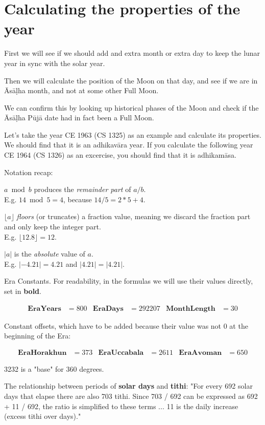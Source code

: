\documentclass[11pt,oneside]{memoir-article}
\begin{document}
\section{Calculating the properties of the year}
\label{sec-5-2}

First we will see if we should add and extra month or extra day to keep the
lunar year in sync with the solar year.

Then we will calculate the position of the Moon on that day, and see if we are
in Āsāḷha month, and not at some other Full Moon.

We can confirm this by looking up historical phases of the Moon and check if the
Āsāḷha Pūjā date had in fact been a Full Moon.

Let's take the year CE 1963 (CS 1325) as an example and calculate its
properties. We should find that it is an adhikavāra year. If you calculate the
following year CE 1964 (CS 1326) as an excercise, you should find that it is
adhikamāsa.

Notation recap:

$a \bmod b$ produces the \emph{remainder part} of $a/b$.\\
E.g. $14 \bmod 5 = 4$, because $14/5 = 2*5 + 4$.

$\lfloor a \rfloor$ \emph{floors} (or truncates) a fraction value, meaning we discard
the fraction part and only keep the integer part.\\
E.g. $\lfloor 12.8 \rfloor = 12$.

$|a|$ is the \emph{absolute} value of $a$.\\
E.g. $|-4.21| = 4.21$ and $|4.21| = |4.21|$.


Era Constants. For readability, in the formulas we will use their values directly, set in \textbf{bold}.

\begin{align*}
  \mathbf{EraYears} & = 800 & \mathbf{EraDays} & = 292207 & \mathbf{MonthLength} & = 30
\end{align*}

Constant offsets, which have to be added because their value was not 0 at the beginning of the Era:

\begin{align*}
  \mathbf{EraHorakhun} & = 373 & \mathbf{EraUccabala} & = 2611 & \mathbf{EraAvoman} & = 650 
\end{align*}

3232 is a "base" for 360 degrees.\autocite[p. 48]{eade1995calendrical}

The relationship between periods of \textbf{solar days} and \textbf{tithi}:
"For every 692 solar days that elapse there are also 703 tithi.
Since 703 / 692 can be expressed as 692 + 11 / 692, the ratio is simplified to these terms ...
11 is the daily increase (excess tithi over days)."\autocite[p. 48]{eade1995calendrical}
\end{document}
